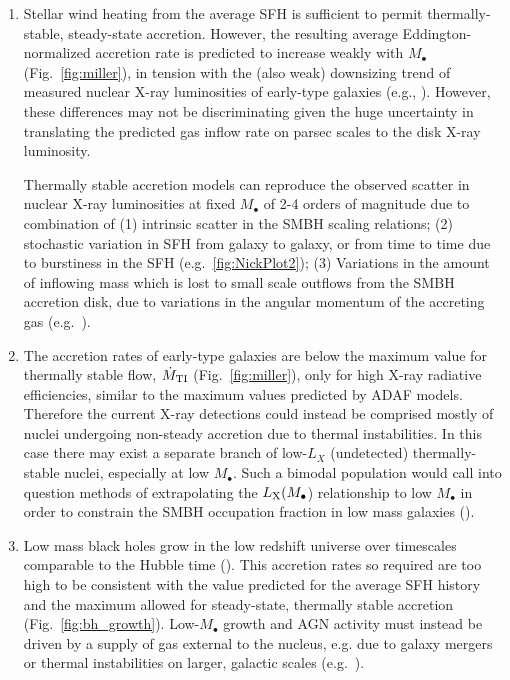 \documentclass[usenatbib,fleqn]{mn2e}
\newcommand{\Mdot}{\dot{M}}
\newcommand{\rs}{r_s}
\newcommand{\rb}{r_b}
\newcommand{\Mbh}[1][]{M_{\bullet#1}}
\begin{document}
\begin{enumerate}
\item Stellar wind heating from the average SFH is sufficient to
  permit thermally-stable, steady-state accretion.  However, the
  resulting average Eddington-normalized accretion rate is predicted
  to increase weakly with $M_{\bullet}$ (Fig.~\ref{fig:miller}), in
  tension with the (also weak) downsizing trend of measured nuclear
  X-ray luminosities of early-type galaxies (e.g.,
  \citealt{Miller+15}).  However, these differences may not be
  discriminating given the huge uncertainty in translating the
  predicted gas inflow rate on parsec scales to the disk X-ray
  luminosity.

  Thermally stable accretion models can reproduce the observed scatter
  in nuclear X-ray luminosities at fixed $\Mbh$ of 2-4 orders of
  magnitude due to combination of (1) intrinsic scatter in the SMBH
  scaling relations; (2) stochastic variation in SFH from galaxy to
  galaxy, or from time to time due to burstiness in the SFH
  (e.g.~\ref{fig:NickPlot2}); (3) Variations in the amount of
  inflowing mass which is lost to small scale outflows from the SMBH
  accretion disk, due to variations in the angular momentum of the
  accreting gas (e.g.~\citealt{Li+13}).

\item  The accretion rates of early-type galaxies are below the maximum value for thermally stable flow, $\dot{M}_{\rm TI}$ (Fig.~\ref{fig:miller}), only for high X-ray radiative efficiencies, similar to the maximum values predicted by ADAF models.  Therefore the current X-ray detections could instead be comprised mostly of nuclei undergoing non-steady accretion due to thermal instabilities.  In this case there may exist a separate branch of low-$L_X$ (undetected) thermally-stable nuclei, especially at low $M_{\bullet}$.  Such a bimodal population would call into question methods of extrapolating the $L_{\rm X}(M_{\bullet}$) relationship to low $M_{\bullet}$ in order to constrain the SMBH occupation fraction in low mass galaxies (\citealt{Miller+15}).

\item Low mass black holes grow in the low redshift universe over
  timescales comparable to the Hubble time (\citealt{Heckman+04}).  This
  accretion rates so required are too high to be consistent with the
  value predicted for the average SFH history and the maximum allowed
  for steady-state, thermally stable accretion
  (Fig.~\ref{fig:bh_growth}).  Low-$M_{\bullet}$ growth and AGN
  activity must instead be driven by a supply of gas external to the
  nucleus, e.g. due to galaxy mergers or thermal instabilities on
  larger, galactic scales (e.g.~\citealt{Voit+15}).

    

\end{enumerate}
\end{document}
